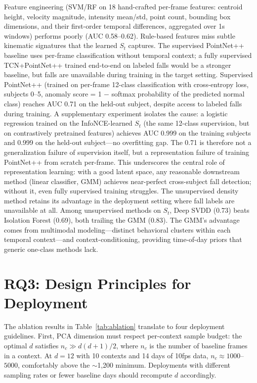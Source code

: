 \documentclass[11pt,a4paper]{article}
\begin{document}
Feature engineering (SVM/RF on 18 hand-crafted per-frame features: centroid height, velocity magnitude, intensity mean/std, point count, bounding box dimensions, and their first-order temporal differences, aggregated over 1s windows) performs poorly (AUC 0.58--0.62).
Rule-based features miss subtle kinematic signatures that the learned $S_t$ captures.
The supervised PointNet++ baseline uses per-frame classification without temporal context; a fully supervised TCN+PointNet++ trained end-to-end on labeled falls would be a stronger baseline, but falls are unavailable during training in the target setting.
Supervised PointNet++ (trained on per-frame 12-class classification with cross-entropy loss, subjects 0--5, anomaly score = 1 $-$ softmax probability of the predicted normal class) reaches AUC 0.71 on the held-out subject, despite access to labeled falls during training.
A supplementary experiment isolates the cause: a logistic regression trained on the InfoNCE-learned $S_t$ (the same 12-class supervision, but on contrastively pretrained features) achieves AUC 0.999 on the training subjects and 0.999 on the held-out subject---no overfitting gap.
The 0.71 is therefore not a generalization failure of supervision itself, but a representation failure of training PointNet++ from scratch per-frame.
This underscores the central role of representation learning: with a good latent space, any reasonable downstream method (linear classifier, GMM) achieves near-perfect cross-subject fall detection; without it, even fully supervised training struggles.
The unsupervised density method retains its advantage in the deployment setting where fall labels are unavailable at all.
Among unsupervised methods on $S_t$, Deep SVDD (0.73) beats Isolation Forest (0.69), both trailing the GMM (0.83).
The GMM's advantage comes from multimodal modeling---distinct behavioral clusters within each temporal context---and context-conditioning, providing time-of-day priors that generic one-class methods lack.

\section{RQ3: Design Principles for Deployment}

The ablation results in Table~\ref{tab:ablation} translate to four deployment guidelines.
First, PCA dimension must respect per-context sample budget: the optimal $d$ satisfies $n_c \gg d(d{+}1)/2$, where $n_c$ is the number of baseline frames in a context.
At $d{=}12$ with 10 contexts and 14 days of 10fps data, $n_c \approx 1000$--$5000$, comfortably above the $\sim$1,200 minimum.
Deployments with different sampling rates or fewer baseline days should recompute $d$ accordingly.
\end{document}
